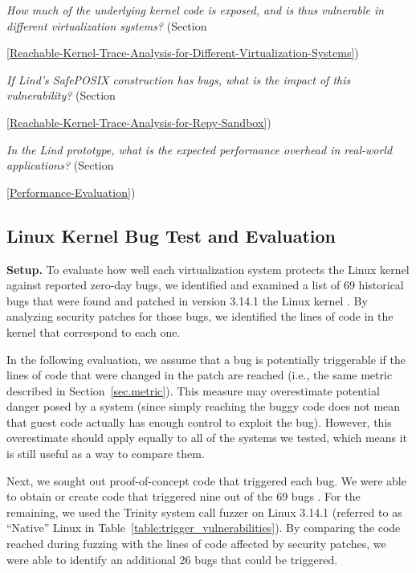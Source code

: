\textit{How much of the underlying kernel code is exposed, and is thus
vulnerable in different virtualization systems?}
(Section~{{\ref{Reachable-Kernel-Trace-Analysis-for-Different-Virtualization-Systems}})

\textit{If Lind's SafePOSIX construction has bugs, what is the impact of
this vulnerability?}
(Section~{{\ref{Reachable-Kernel-Trace-Analysis-for-Repy-Sandbox}})

\textit{In the Lind prototype, what is the expected performance overhead in
real-world applications?}
(Section~{{\ref{Performance-Evaluation}})

\subsection{Linux Kernel Bug Test and Evaluation}
\label{Linux-Kernel-Bug-Test-and-Evaluation}


\noindent
\textbf{Setup.}
To evaluate how well each virtualization system protects the Linux kernel
against reported zero-day bugs,
we identified and examined a list of 69 historical bugs that were found and patched in version 3.14.1 the Linux kernel \cite{CVE-Datasource}.
By analyzing security patches for those bugs,
we identified the lines of code in the kernel that correspond to each one.

In the following evaluation, we assume that a bug is potentially triggerable if the lines of code that were changed in the patch are reached 
(i.e., the same metric described in Section~\ref{sec.metric}).
This measure may overestimate potential danger posed by a system (since simply reaching the buggy code does not mean that guest code 
actually has enough control to exploit the bug).
However, this overestimate should apply equally to all of the systems we tested, which means it is still useful as a way to compare them.

Next, we sought out proof-of-concept code that triggered each bug. 
We were able to obtain or create code that triggered nine out of the 69 bugs \cite{Exploit-Database}.
For the remaining, we used the Trinity system call fuzzer 
\cite{Trinity} on Linux 3.14.1 (referred to as ``Native'' Linux in Table~\ref{table:trigger_vulnerabilities}).
By comparing the code reached during fuzzing with the lines of code affected by security patches, 
we were able to identify an additional 26 bugs that could be triggered.

}}}
